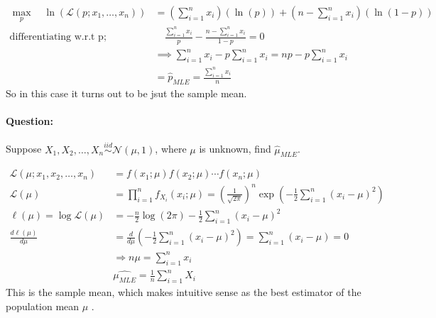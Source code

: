 \documentclass[12pt,a4paper]{article}
\begin{document}
     \begin{align*}
           \max_{p}  \quad \ln(\mathcal{L}(p;x_{1},\ldots,x_{n}))&= (\sum_{i=1}^{n}x_{i})(\ln(p))+(n-\sum_{i=1}^{n}x_{i} )(\ln(1-p))\\
           \text{differentiating w.r.t p}; & \quad \frac{\sum_{i=1}^{n} x_{i}}{p} - \frac{n-\sum_{i=1}^{n} x_{i}}{1-p}=0\\
           &\implies \sum_{i=1}^{n} x_{i} - p\sum_{i=1}^{n} x_{i}= np - p\sum_{i=1}^{n} x_{i}\\
           &=\hat{p}_{MLE}=\frac{\sum_{i=1}^{n} x_{i}}{n}
    \end{align*}
     So in this case it turns out to be jsut the sample mean.
    
     \paragraph{Question:}
     Suppose \(X_{1},X_{2},\ldots,X_{n}\overset{iid}{\sim}\mathcal{N}(\mu ,1)\), where \(\mu\) is unknown, find \(\hat{\mu}_{MLE}\).
     
    \begin{align*}
        \mathcal{L}(\mu ; x_{1},x_{2},\ldots,x_{n})&=f(x_{1};\mu)f(x_{2};\mu) \cdots f(x_{n};\mu) \\
        \mathcal{L}(\mu) &= \prod_{i=1}^n f_{X_i}(x_i; \mu) = \left(\frac{1}{\sqrt{2\pi}}\right)^n \exp\left(-\frac{1}{2} \sum_{i=1}^n (x_i - \mu)^2\right)\\
        \ell(\mu) = \log \mathcal{L}(\mu) &= -\frac{n}{2} \log(2\pi) - \frac{1}{2} \sum_{i=1}^n (x_i - \mu)^2\\\frac{d\ell(\mu)}{d\mu} &= \frac{d}{d\mu} \left(-\frac{1}{2} \sum_{i=1}^n (x_i - \mu)^2\right) = \sum_{i=1}^n (x_i - \mu)=0\\
        &\Rightarrow n\mu = \sum_{i=1}^n x_i\\
        &\hat{\mu_{MLE}} = \frac{1}{n} \sum_{i=1}^n X_i        
    \end{align*} 
    This is the sample mean, which makes intuitive sense as the best estimator of the population mean \(\mu\)  .
\end{document}
